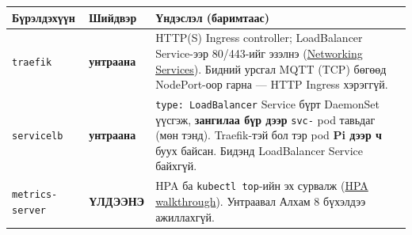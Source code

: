 \begingroup\scriptsize\begin{longtable}[]{@{}lll@{}}
\toprule
\begin{minipage}[b]{0.30\columnwidth}\raggedright
Бүрэлдэхүүн\strut
\end{minipage} & \begin{minipage}[b]{0.30\columnwidth}\raggedright
Шийдвэр\strut
\end{minipage} & \begin{minipage}[b]{0.30\columnwidth}\raggedright
Үндэслэл (баримтаас)\strut
\end{minipage}\tabularnewline
\midrule
\endhead
\begin{minipage}[t]{0.30\columnwidth}\raggedright
\texttt{traefik}\strut
\end{minipage} & \begin{minipage}[t]{0.30\columnwidth}\raggedright
\textbf{унтраана}\strut
\end{minipage} & \begin{minipage}[t]{0.30\columnwidth}\raggedright
HTTP(S) Ingress controller; LoadBalancer Service-ээр 80/443-ийг эзэлнэ (\href{https://docs.k3s.io/networking/networking-services}{Networking Services}). Бидний урсгал MQTT (TCP) бөгөөд NodePort-оор гарна --- HTTP Ingress хэрэггүй.\strut
\end{minipage}\tabularnewline
\begin{minipage}[t]{0.30\columnwidth}\raggedright
\texttt{servicelb}\strut
\end{minipage} & \begin{minipage}[t]{0.30\columnwidth}\raggedright
\textbf{унтраана}\strut
\end{minipage} & \begin{minipage}[t]{0.30\columnwidth}\raggedright
\texttt{type:\allowbreak{}\ LoadBalancer} Service бүрт DaemonSet үүсгэж, \textbf{зангилаа бүр дээр} \texttt{svc-} pod тавьдаг (мөн тэнд). Traefik-тэй бол тэр pod \textbf{Pi дээр ч} буух байсан. Бидэнд LoadBalancer Service байхгүй.\strut
\end{minipage}\tabularnewline
\begin{minipage}[t]{0.30\columnwidth}\raggedright
\texttt{metrics-server}\strut
\end{minipage} & \begin{minipage}[t]{0.30\columnwidth}\raggedright
\textbf{ҮЛДЭЭНЭ}\strut
\end{minipage} & \begin{minipage}[t]{0.30\columnwidth}\raggedright
HPA ба \texttt{kubectl\ top}-ийн эх сурвалж (\href{https://kubernetes.io/docs/tasks/run-application/horizontal-pod-autoscale-walkthrough/}{HPA walkthrough}). Унтраавал Алхам 8 бүхэлдээ ажиллахгүй.\strut

\end{minipage}
\end{longtable}

